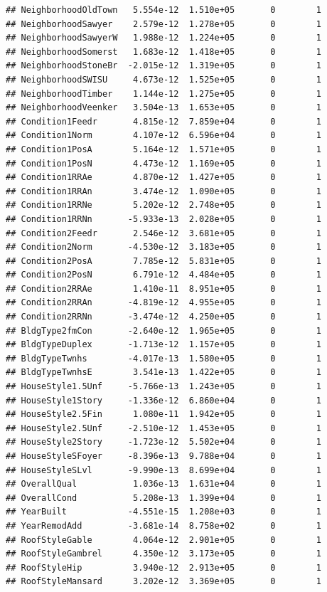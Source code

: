 \documentclass[
]{article}
\begin{document}
\begin{verbatim}
## NeighborhoodOldTown   5.554e-12  1.510e+05       0        1
## NeighborhoodSawyer    2.579e-12  1.278e+05       0        1
## NeighborhoodSawyerW   1.988e-12  1.224e+05       0        1
## NeighborhoodSomerst   1.683e-12  1.418e+05       0        1
## NeighborhoodStoneBr  -2.015e-12  1.319e+05       0        1
## NeighborhoodSWISU     4.673e-12  1.525e+05       0        1
## NeighborhoodTimber    1.144e-12  1.275e+05       0        1
## NeighborhoodVeenker   3.504e-13  1.653e+05       0        1
## Condition1Feedr       4.815e-12  7.859e+04       0        1
## Condition1Norm        4.107e-12  6.596e+04       0        1
## Condition1PosA        5.164e-12  1.571e+05       0        1
## Condition1PosN        4.473e-12  1.169e+05       0        1
## Condition1RRAe        4.870e-12  1.427e+05       0        1
## Condition1RRAn        3.474e-12  1.090e+05       0        1
## Condition1RRNe        5.202e-12  2.748e+05       0        1
## Condition1RRNn       -5.933e-13  2.028e+05       0        1
## Condition2Feedr       2.546e-12  3.681e+05       0        1
## Condition2Norm       -4.530e-12  3.183e+05       0        1
## Condition2PosA        7.785e-12  5.831e+05       0        1
## Condition2PosN        6.791e-12  4.484e+05       0        1
## Condition2RRAe        1.410e-11  8.951e+05       0        1
## Condition2RRAn       -4.819e-12  4.955e+05       0        1
## Condition2RRNn       -3.474e-12  4.250e+05       0        1
## BldgType2fmCon       -2.640e-12  1.965e+05       0        1
## BldgTypeDuplex       -1.713e-12  1.157e+05       0        1
## BldgTypeTwnhs        -4.017e-13  1.580e+05       0        1
## BldgTypeTwnhsE        3.541e-13  1.422e+05       0        1
## HouseStyle1.5Unf     -5.766e-13  1.243e+05       0        1
## HouseStyle1Story     -1.336e-12  6.860e+04       0        1
## HouseStyle2.5Fin      1.080e-11  1.942e+05       0        1
## HouseStyle2.5Unf     -2.510e-12  1.453e+05       0        1
## HouseStyle2Story     -1.723e-12  5.502e+04       0        1
## HouseStyleSFoyer     -8.396e-13  9.788e+04       0        1
## HouseStyleSLvl       -9.990e-13  8.699e+04       0        1
## OverallQual           1.036e-13  1.631e+04       0        1
## OverallCond           5.208e-13  1.399e+04       0        1
## YearBuilt            -4.551e-15  1.208e+03       0        1
## YearRemodAdd         -3.681e-14  8.758e+02       0        1
## RoofStyleGable        4.064e-12  2.901e+05       0        1
## RoofStyleGambrel      4.350e-12  3.173e+05       0        1
## RoofStyleHip          3.940e-12  2.913e+05       0        1
## RoofStyleMansard      3.202e-12  3.369e+05       0        1

\end{verbatim}
\end{document}
